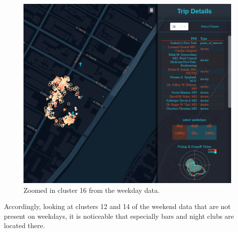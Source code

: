 \documentclass[sigconf, authorversion, nonacm=true]{acmart}
\begin{document}
\begin{figure}[h]
  \centering
  \includegraphics[width=0.95\linewidth]{cluster16_day}
  \caption{Zoomed in cluster 16 from the weekday data.}
  \label{fig:cluster16_day}
\end{figure}

Accordingly, looking at clusters 12 and 14 of the weekend data that are not present on weekdays, it is noticeable that especially bars and night clubs are located there. \\
\end{document}
